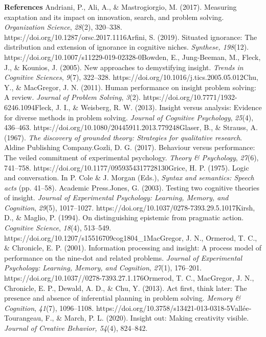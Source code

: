 {{\textbf{\hfill\break } 
\textbf{References} 
Andriani, P., Ali, A., \& Mastrogiorgio, M. (2017). Measuring exaptation and its impact on innovation, search, and problem solving.
\emph{Organization Science}, \emph{28}(2), 320--338.
https://doi.org/10.1287/orsc.2017.1116Arfini, S. (2019). Situated ignorance: The distribution and extension of ignorance in cognitive niches. \emph{Synthese, 198}(12).
https://doi.org/10.1007/s11229-019-02328-0Bowden, E., Jung-Beeman, M., Fleck, J., \& Kounios, J. (2005). New approaches to demystifying insight. \emph{Trends in Cognitive Sciences}, \emph{9}(7), 322--328.
https://doi.org/10.1016/j.tics.2005.05.012Chu, Y., \& MacGregor, J. N.
(2011). Human performance on insight problem solving: A review.
\emph{Journal of Problem Solving}, \emph{3}(2).
https://doi.org/10.7771/1932-6246.1094Fleck, J. I., \& Weisberg, R. W.
(2013). Insight versus analysis: Evidence for diverse methods in problem solving. \emph{Journal of Cognitive Psychology}, \emph{25}(4), 436--463.
https://doi.org/10.1080/20445911.2013.779248Glaser, B., \& Strauss, A.
(1967). \emph{The discovery of grounded theory: Strategies for qualitative research}. Aldine Publishing Company.Gozli, D. G. (2017).
Behaviour versus performance: The veiled commitment of experimental psychology. \emph{Theory \& Psychology}, \emph{27}(6), 741--758.
https://doi.org/10.1177/0959354317728130Grice, H. P. (1975). Logic and conversation. In P. Cole \& J. Morgan (Eds.), \emph{Syntax and semantics: Speech acts} (pp. 41--58). Academic Press.Jones, G. (2003).
Testing two cognitive theories of insight. \emph{Journal of Experimental Psychology: Learning, Memory, and Cognition}, \emph{29}(5), 1017--1027.
https://doi.org/10.1037/0278-7393.29.5.1017Kirsh, D., \& Maglio, P.
(1994). On distinguishing epistemic from pragmatic action.
\emph{Cognitive Science}, \emph{18}(4), 513--549.
https://doi.org/10.1207/s15516709cog1804\_1MacGregor, J. N., Ormerod, T.
C., \& Chronicle, E. P. (2001). Information processing and insight: A process model of performance on the nine-dot and related problems.
\emph{Journal of Experimental Psychology: Learning, Memory, and Cognition}, \emph{27}(1), 176--201.
https://doi.org/10.1037//0278-7393.27.1.176Ormerod, T. C., MacGregor, J.
N., Chronicle, E. P., Dewald, A. D., \& Chu, Y. (2013). Act first, think later: The presence and absence of inferential planning in problem solving. \emph{Memory \& Cognition}, \emph{41}(7), 1096--1108.
https://doi.org/10.3758/s13421-013-0318-5Vallée‐Tourangeau, F., \& March, P. L. (2020). Insight out: Making creativity visible.
\emph{Journal of Creative Behavior, 54}(4), 824­--842.
}}
